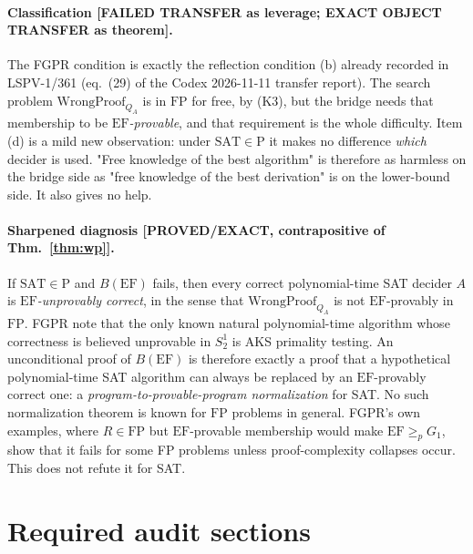 \documentclass[11pt]{article}
\theoremstyle{definition}
\theoremstyle{remark}
\newcommand{\SAT}{\mathrm{SAT}}
\newcommand{\EF}{\mathrm{EF}}
\newcommand{\FP}{\mathrm{FP}}
\newcommand{\WP}{\mathrm{WrongProof}}
\newcommand{\status}[1]{\textbf{[#1]}}
\begin{document}
\paragraph{Classification \status{FAILED TRANSFER as leverage; EXACT OBJECT TRANSFER as theorem}.}
The FGPR condition is exactly the reflection condition (b) already recorded in LSPV-1/361 (eq.~(29)
of the Codex 2026-11-11 transfer report). The search problem $\WP_{Q_A}$ is in $\FP$ for free, by (K3),
but the bridge needs that membership to be \emph{$\EF$-provable}, and that requirement is the whole difficulty.
Item (d) is a mild new observation: under $\SAT\in\mathrm P$ it makes no difference \emph{which} decider is used.
"Free knowledge of the best algorithm" is therefore as harmless on the bridge side as "free knowledge of the best derivation" is on the
lower-bound side. It also gives no help.

\paragraph{Sharpened diagnosis \status{PROVED/EXACT, contrapositive of Thm.~\ref{thm:wp}}.}
If $\SAT\in\mathrm P$ and $B(\EF)$ fails, then every correct polynomial-time SAT decider $A$ is
\emph{$\EF$-unprovably correct}, in the sense that $\WP_{Q_A}$ is not $\EF$-provably in $\FP$. FGPR note that the only known
natural polynomial-time algorithm whose correctness is believed unprovable in $S^1_2$ is AKS primality testing.
An unconditional proof of $B(\EF)$ is therefore exactly a proof that a hypothetical polynomial-time SAT algorithm can always be
replaced by an $\EF$-provably correct one: a \emph{program-to-provable-program normalization} for SAT.
No such normalization theorem is known for $\FP$ problems in general. FGPR's own examples, where $R\in\FP$ but $\EF$-provable membership would make
$\EF\ge_p G_1$, show that it fails for some FP problems unless proof-complexity collapses occur.
This does not refute it for SAT.

\section{Required audit sections}
\end{document}
